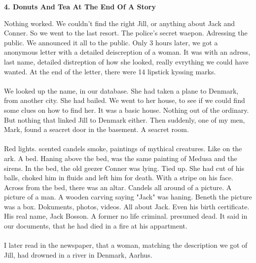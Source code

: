 \documentclass[]{article}
\begin{document}
\newpage

\begin{center}
	\large\textbf{4. Donuts And Tea At The End Of A Story}
\end{center}

Nothing worked. We couldn't find the right Jill, or anything about Jack and Conner. So we went to the last resort. The police's secret waepon. Adressing the public. We announced it all to the public. Only 3 hours later, we got a anonymous letter with a detailed deiscreption of a woman. It was with an adress, last name, detailed distreption of how she looked, really evrything we could have wanted. At the end of the letter, there were 14 lipstick kyssing marks.
\\ \\
We looked up the name, in our database. She had taken a plane to Denmark, from another city. She had bailed. We went to her house, to see if we could find some clues on how to find her. It was a basic house. Nothing out of the ordinary. But nothing that linked Jill to Denmark either. Then suddenly, one of my men, Mark, found a seacret door in the basement. A seacret room. 
\\ \\
Red lights. scented candels smoke, paintings of mythical creatures. Like on the ark. A bed. Haning above the bed, was the same painting of Medusa and the sirens. In the bed, the old geezer Conner was lying. Tied up. She had cut of his balls, choked him in fluids and left him for death. With a stripe on his face. Across from the bed, there was an altar. Candels all around of a picture. A picture of a man. A wooden carving saying "Jack" was haning. Beneth the picture was a box. Dokuments, photos, videos. All about Jack. Even his birth certificate. His real name, Jack Bosson. A former no life criminal. presumed dead. It said in our documents, that he had died in a fire at his appartment.  
\\ \\
I later read in the newspaper, that a woman, matching the description we got of Jill, had drowned in a river in Denmark, Aarhus. 
\end{document}
